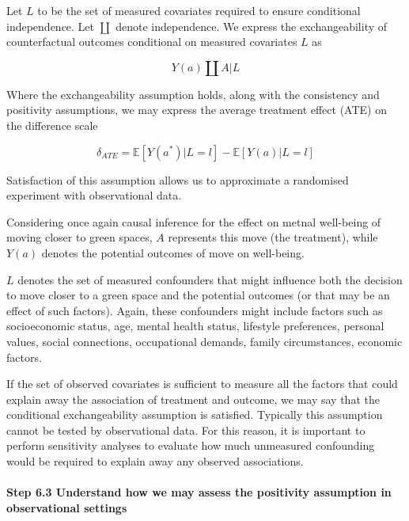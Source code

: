 \documentclass[
  singlecolumn]{article}
\let\oldparagraph\paragraph
\renewcommand{\paragraph}[1]{\oldparagraph{#1}\mbox{}}
\begin{document}
Let \(L\) to be the set of measured covariates required to ensure
conditional independence. Let \(\coprod\) denote independence. We
express the exchangeability of counterfactual outcomes conditional on
measured covariates \(L\) as

\[
Y(a) \coprod  A|L
\]

Where the exchangeability assumption holds, along with the consistency
and positivity assumptions, we may express the average treatment effect
(ATE) on the difference scale

\[
\delta_{ATE}  = \mathbb{E}[Y(a^*)|L = l] - \mathbb{E}[Y(a)|L = l]
\]

Satisfaction of this assumption allows us to approximate a randomised
experiment with observational data.

Considering once again causal inference for the effect on metnal
well-being of moving closer to green spaces, \(A\) represents this move
(the treatment), while \(Y(a)\) denotes the potential outcomes of move
on well-being.

\(L\) denotes the set of measured confounders that might influence both
the decision to move closer to a green space and the potential outcomes
(or that may be an effect of such factors). Again, these confounders
might include factors such as socioeconomic status, age, mental health
status, lifestyle preferences, personal values, social connections,
occupational demands, family circumstances, economic factors.

If the set of observed covariates is sufficient to measure all the
factors that could explain away the association of treatment and
outcome, we may say that the conditional exchangeability assumption is
satisfied. Typically this assumption cannot be tested by observational
data. For this reason, it is important to perform sensitivity analyses
to evaluate how much unmeasured confounding would be required to explain
away any observed associations.

\hypertarget{step-6.3-understand-how-we-may-assess-the-positivity-assumption-in-observational-settings}{%
\paragraph{\texorpdfstring{\textbf{Step 6.3 Understand how we may assess
the positivity assumption in observational
settings}}{Step 6.3 Understand how we may assess the positivity assumption in observational settings}}\label{step-6.3-understand-how-we-may-assess-the-positivity-assumption-in-observational-settings}}
\end{document}
